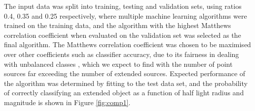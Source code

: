 \documentclass[useAMS,usenatbib]{mn2e}
\begin{document}
The input data was split into training, testing and validation sets, using ratios 0.4, 0.35 and 0.25 respectively, where multiple machine learning algorithms were trained on the training data, and the algorithm with the highest Matthews correlation coefficient\citep{matthews1975comparison} when evaluated on the validation set was selected as the final algorithm. The Matthews correlation coefficient was chosen to be maximised over other coefficients such as classifier accuracy, due to its fairness in dealing with unbalanced classes \citep{Baldi2000, Jurman2012}, which we expect to find with the number of point sources far exceeding the number of extended sources. Expected performance of the algorithm was determined by fitting to the test data set, and the probability of correctly classifying an extended object as a function of half light radius and magnitude is shown in Figure \ref{fig:comp1}.
\end{document}
